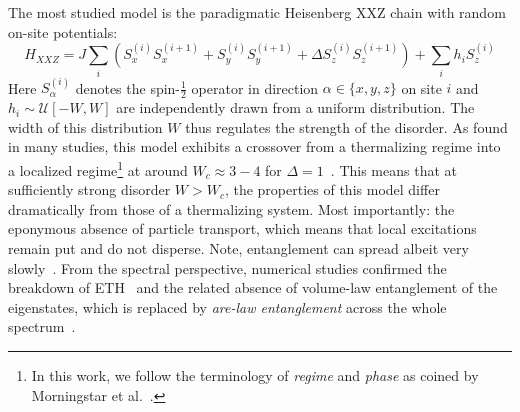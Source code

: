 The most studied model is the paradigmatic Heisenberg XXZ chain with random on-site potentials:
\begin{equation}\label{eq:XXZ-onsite}
	H_{XXZ} = J \sum_i \left(S_x^{(i)}S_x^{(i+1)} + S_y^{(i)}S_y^{(i+1)} + \Delta S_z^{(i)}S_z^{(i+1)}\right) + \sum_i h_i S_z^{(i)}
\end{equation}
Here $S_\alpha^{(i)}$ denotes the spin-$\frac{1}{2}$ operator in direction $\alpha\in\{x,y,z\}$ on site $i$ and $h_i \sim \mathcal{U}[-W,W]$ are independently drawn from a uniform distribution. The width of this distribution $W$ thus regulates the strength of the disorder.
As found in many studies, this model exhibits a crossover from a thermalizing regime into a localized regime\footnote{In this work, we follow the terminology of \emph{regime} and \emph{phase} as coined by Morningstar et al.~\cite{morningstarAvalanchesManybodyResonances2022}.} at around $W_c \approx 3-4$ for $\Delta=1$~\cite{oganesyanLocalizationInteractingFermions2007,palManybodyLocalizationPhase2010,berkelbachConductivityDisorderedQuantum2010,delucaErgodicityBreakingModel2013,bauerAreaLawsManybody2013,nanduriEntanglementSpreadingManybody2014,luitzManybodyLocalizationEdge2015,serbynCriterionManybodyLocalizationdelocalization2015,barlevAbsenceDiffusionInteracting2015,devakulEarlyBreakdownAreaLaw2015,luitzExtendedSlowDynamical2016,maceMultifractalScalingsManyBody2019,loganManybodyLocalizationFock2019,chandaManybodyLocalizationTransition2020,tarziaManybodyLocalizationTransition2020,sierantPolynomiallyFilteredExact2020}.
This means that at sufficiently strong disorder $W>W_c$, the properties of this model differ dramatically from those of a thermalizing system. Most importantly: the eponymous absence of particle transport, which means that local excitations remain put and do not disperse. Note, entanglement can spread albeit very slowly~\cite{znidaricManyBodyLocalization2008,bardarsonUnboundedGrowthEntanglement2012,nanduriEntanglementSpreadingManybody2014,kiefer-emmanouilidisEvidenceUnboundedGrowth2020,luitzThereSlowParticle2020,huangExtensiveEntropyUnitary2021,chavezUltraslowGrowthNumber2023}.
From the spectral perspective, numerical studies confirmed the breakdown of ETH~\cite{kimTestingWhetherAll2014,albaEigenstateThermalizationHypothesis2015,mondainiEigenstateThermalizationTwodimensional2016,mierzejewskiEigenstateThermalizationHypothesis2020} and the related absence of volume-law entanglement of the eigenstates, which is replaced by \emph{are-law entanglement} across the whole spectrum~\cite{bauerAreaLawsManybody2013,geraedtsManybodyLocalizationThermalization2016}. 


